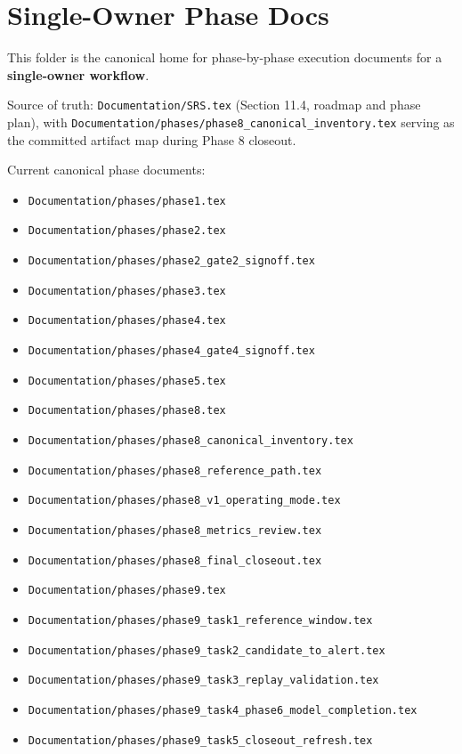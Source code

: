 \documentclass{article}
\begin{document}
\section*{Single-Owner Phase Docs}

This folder is the canonical home for phase-by-phase execution documents for a
\textbf{single-owner workflow}.

Source of truth: \texttt{Documentation/SRS.tex} (Section 11.4, roadmap and
phase plan), with \texttt{Documentation/phases/phase8\_canonical\_inventory.tex}
serving as the committed artifact map during Phase 8 closeout.

Current canonical phase documents:
\begin{itemize}
\item \texttt{Documentation/phases/phase1.tex}
\item \texttt{Documentation/phases/phase2.tex}
\item \texttt{Documentation/phases/phase2\_gate2\_signoff.tex}
\item \texttt{Documentation/phases/phase3.tex}
\item \texttt{Documentation/phases/phase4.tex}
\item \texttt{Documentation/phases/phase4\_gate4\_signoff.tex}
\item \texttt{Documentation/phases/phase5.tex}
\item \texttt{Documentation/phases/phase8.tex}
\item \texttt{Documentation/phases/phase8\_canonical\_inventory.tex}
\item \texttt{Documentation/phases/phase8\_reference\_path.tex}
\item \texttt{Documentation/phases/phase8\_v1\_operating\_mode.tex}
\item \texttt{Documentation/phases/phase8\_metrics\_review.tex}
\item \texttt{Documentation/phases/phase8\_final\_closeout.tex}
\item \texttt{Documentation/phases/phase9.tex}
\item \texttt{Documentation/phases/phase9\_task1\_reference\_window.tex}
\item \texttt{Documentation/phases/phase9\_task2\_candidate\_to\_alert.tex}
\item \texttt{Documentation/phases/phase9\_task3\_replay\_validation.tex}
\item \texttt{Documentation/phases/phase9\_task4\_phase6\_model\_completion.tex}
\item \texttt{Documentation/phases/phase9\_task5\_closeout\_refresh.tex}

\end{itemize}
\end{document}
